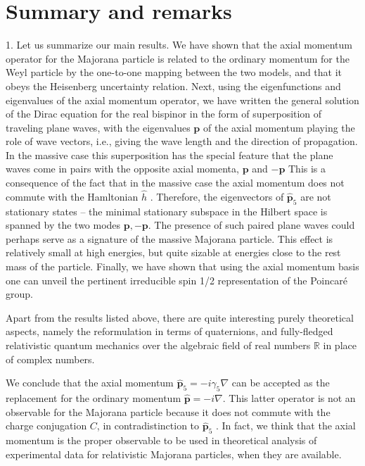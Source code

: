 \documentclass[12pt]{article}
\begin{document}
 
\section{Summary and remarks}
   1.  Let us summarize our main  results.  We have shown that the axial momentum operator for the Majorana particle is related to the ordinary momentum for the Weyl particle by the one-to-one mapping between the two models, and that it obeys the  Heisenberg
uncertainty relation. Next, using the eigenfunctions and eigenvalues of the axial momentum operator, we have written the general solution of the Dirac equation for the real bispinor in the form of superposition of traveling plane waves, with the eigenvalues $\mathbf{p}$ of the  axial momentum playing the role of wave vectors, i.e., giving the wave length and the direction of propagation.  In the massive case this superposition has the special feature that the plane waves  come in pairs with the opposite axial momenta,  $\mathbf{p}$ and $-\mathbf{p}$    This is a  consequence of the fact that in the massive case the axial momentum does not commute with the Hamltonian $\hat{h}$ .  Therefore, the eigenvectors of  $\hat{\mathbf{p}}_5$ are not stationary states -- the minimal stationary subspace in the Hilbert space is spanned by the two modes $\mathbf{p}, -\mathbf{p}$.  The presence of   such paired plane waves could perhaps serve  as a signature  of  the massive Majorana particle. This effect is relatively small at high energies,  but quite sizable at  energies close to the rest mass of the particle.     Finally,  we have shown that using the axial momentum basis one can unveil  the pertinent  irreducible spin 1/2 representation of the Poincar\'e group. 


Apart from the results listed above, there are quite interesting purely theoretical aspects, namely  the  reformulation in terms of quaternions,  and  fully-fledged relativistic quantum mechanics over the algebraic field of real numbers $\mathbb{R}$ in place of complex numbers. 

     We conclude that  the axial momentum   $\hat{\mathbf{p}}_5 = -i \gamma_5 \nabla$ can be accepted as  the replacement for the ordinary momentum  $\hat{\mathbf{p}} = -i \nabla$. This latter operator  is not an observable for the Majorana particle  because it  does not commute with the charge conjugation $C$,  in contradistinction to $\hat{\mathbf{p}}_5$ .  In fact, we think that the axial momentum is 
the proper observable to be used in theoretical analysis of experimental data  for relativistic Majorana particles, when they are available.  \\
\end{document}
